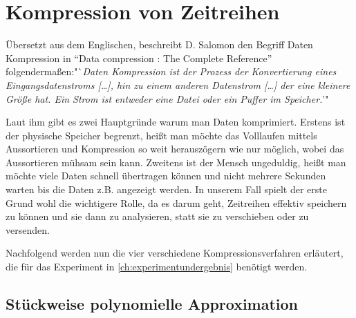 \section{Kompression von Zeitreihen}
Übersetzt aus dem Englischen, beschreibt D. Salomon den Begriff Daten Kompression in "`Data compression : The Complete Reference"'\cite[p. 1-2]{d2004} folgendermaßen:"`\textit{Daten Kompression ist der Prozess der Konvertierung eines Eingangsdatenstroms [\ldots], hin zu einem anderen Datenstrom [\ldots] der eine kleinere Größe hat. Ein Strom ist entweder eine Datei oder ein Puffer im Speicher.}'"

Laut ihm gibt es zwei Hauptgründe warum man Daten komprimiert. Erstens ist der physische Speicher begrenzt, heißt man möchte das Volllaufen mittels Aussortieren und Kompression so weit herauszögern wie nur möglich, wobei das Aussortieren mühsam sein kann. Zweitens ist der Mensch ungeduldig, heißt man möchte viele Daten schnell übertragen können und nicht mehrere Sekunden warten bis die Daten z.B. angezeigt werden. In unserem Fall spielt der erste Grund wohl die wichtigere Rolle, da es darum geht, Zeitreihen effektiv speichern zu können und sie dann zu analysieren, statt sie zu verschieben oder zu versenden.

Nachfolgend werden nun die vier verschiedene Kompressionsverfahren erläutert, die für das Experiment in \autoref{ch:experimentundergebnis} benötigt werden.

\subsection{Stückweise polynomielle Approximation}
